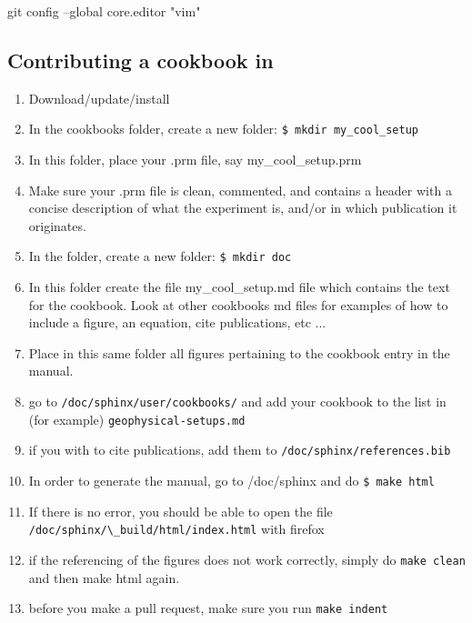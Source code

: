 git config --global core.editor "vim"




\newpage

\subsection{Contributing a cookbook in \aspect}

\begin{enumerate}
\item Download/update/install \aspect 
\item In the cookbooks folder, create a new folder: \verb'$ mkdir my_cool_setup'
\item In this folder, place your .prm file, say my\_cool\_setup.prm
\item Make sure your .prm file is clean, commented, and contains a header with a concise
description of what the experiment is, and/or in which publication it originates.
\item In the folder, create a new folder:  \verb'$ mkdir doc'
\item In this folder create the file my\_cool\_setup.md file which contains the 
text for the cookbook. Look at other cookbooks md files for examples of how 
to include a figure, an equation, cite publications, etc ...
\item Place in this same folder all figures pertaining 
to the cookbook entry in the manual. 
\item go to \verb'/doc/sphinx/user/cookbooks/' and add your cookbook to the list in 
(for example) \verb'geophysical-setups.md'
\item if you with to cite publications, add them to \verb'/doc/sphinx/references.bib'
\item In order to generate the manual, go to /doc/sphinx and do \verb"$ make html"
\item If there is no error, you should be able to open the file \verb'/doc/sphinx/\_build/html/index.html'
with firefox
\item if the referencing of the figures does not work correctly, simply do 
\verb'make clean' and then make html again.
\item before you make a pull request, make sure you run \verb'make indent'
\end{enumerate}



\newpage
